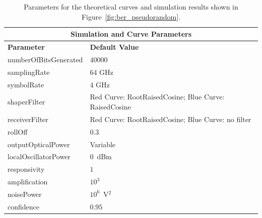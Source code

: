 \begin{refsection}
\begin{table}[H]
	\centering
	\begin{tabular}{|l|l|}
	\hline
	\multicolumn{2}{|c|}{ \textbf{Simulation and Curve Parameters} } \\
		\hline
		\textbf{Parameter}     & \textbf{Default Value}                                     \\\hline
		numberOfBitsGenerated  & $40000$	                                                \\\hline
		samplingRate           & 64 GHz															\\\hline
		symbolRate		       & 4 GHz                                                    		\\\hline
		shaperFilter		   & Red Curve: RootRaisedCosine; Blue Curve: RaisedCosine	    \\\hline
		receiverFilter		   & Red Curve: RootRaisedCosine; Blue Curve: no filter 		\\\hline
		rollOff				   & 0.3														\\\hline
		outputOpticalPower     & Variable                                                   \\ \hline
		localOscillatorPower   & $0$~dBm                                                    \\ \hline
		responsivity           & $1$                                                        \\ \hline
		amplification          & $10^3$                                                     \\ \hline
		noisePower			   & $10^6$~V$^2$                             					\\ \hline
		confidence             & $0.95$                                                     \\ \hline
	\end{tabular}
	\caption{Parameters for the theoretical curves and simulation results shown in Figure~\ref{fig:ber_pseudorandom}.\label{tab:ber_pseudorandom}}
\end{table}


\end{refsection}
